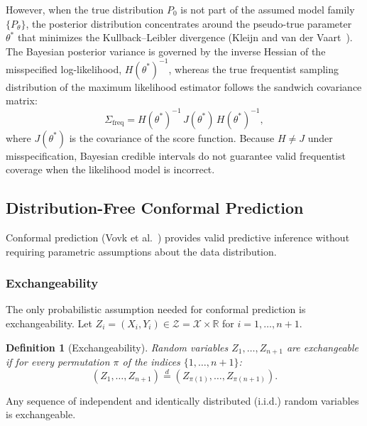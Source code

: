 \documentclass[journal]{IEEEtran}
\newtheorem{definition}{Definition}
\begin{document}
However, when the true distribution $P_0$ is not part of the assumed model family $\{P_\theta\}$, the posterior distribution concentrates around the pseudo-true parameter $\theta^*$ that minimizes the Kullback--Leibler divergence (Kleijn and van der Vaart~\cite{kleijn2012}). The Bayesian posterior variance is governed by the inverse Hessian of the misspecified log-likelihood, $H(\theta^*)^{-1}$, whereas the true frequentist sampling distribution of the maximum likelihood estimator follows the sandwich covariance matrix:
\begin{equation}
\Sigma_{\text{freq}} = H(\theta^*)^{-1} \, J(\theta^*) \, H(\theta^*)^{-1},
\end{equation}
where $J(\theta^*)$ is the covariance of the score function. Because $H \ne J$ under misspecification, Bayesian credible intervals do not guarantee valid frequentist coverage when the likelihood model is incorrect.

\subsection{Distribution-Free Conformal Prediction}
Conformal prediction (Vovk et al.~\cite{vovk2005}) provides valid predictive inference without requiring parametric assumptions about the data distribution.

\subsubsection{Exchangeability}
The only probabilistic assumption needed for conformal prediction is exchangeability. Let $Z_i = (X_i, Y_i) \in \mathcal{Z} = \mathcal{X} \times \mathbb{R}$ for $i = 1, \dots, n+1$.

\begin{definition}[Exchangeability]
Random variables $Z_1, \dots, Z_{n+1}$ are exchangeable if for every permutation $\pi$ of the indices $\{1, \dots, n+1\}$:
\begin{equation}
(Z_1, \dots, Z_{n+1}) \stackrel{d}{=} (Z_{\pi(1)}, \dots, Z_{\pi(n+1)}).
\end{equation}
\end{definition}
Any sequence of independent and identically distributed (i.i.d.) random variables is exchangeable.
\end{document}
